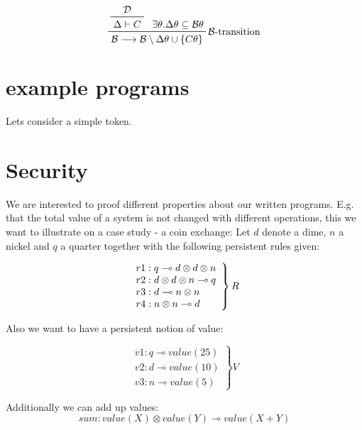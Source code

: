 \documentclass[sigconf]{acmart}
\begin{document}
\begin{equation}
  \prftree[r]
  {$\mathcal{B}$-transition}
  {
    \prftree
    {
      \mathcal{D}
    } {
      \Delta\vdash C
    }
  }
  {\exists\theta. \Delta\theta \subseteq \mathcal{B}\theta}
  {\mathcal{B} \longrightarrow \mathcal{B} \setminus \Delta\theta \cup \{C\theta\}}
\end{equation}

\section{example programs}

Lets consider a simple token.


\section{Security}
We are interested to proof different properties about our written programs. E.g. that the total value of a system is not changed with different operations, this we want to illustrate on a case study - a coin exchange:
Let $d$ denote a dime, $n$ a nickel and $q$ a quarter together with the following persistent rules given:

\[\left.\\
\begin{array}{l}
r1: q\multimap d\otimes d\otimes n \\
r2: d\otimes d\otimes n\multimap q \\
r3: d\multimap n\otimes n \\
r4: n\otimes n\multimap d \\
\end{array}
\right\} R\]

Also we want to have a persistent notion of value:

\[ \left.
\begin{array}{l}
  v1: q\multimap value(25) \\
  v2: d\multimap value(10) \\
  v3: n\multimap value(5)
\end{array}
\right\} V \]

Additionally we can add up values:
\[ sum: value(X)\otimes value(Y)\multimap value(X + Y) \]
\end{document}
